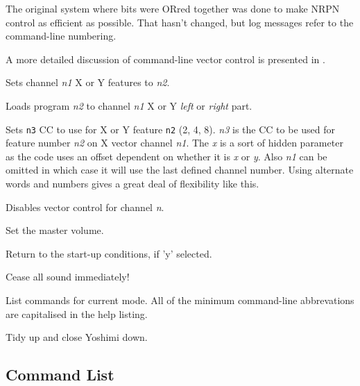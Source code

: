       The original system where bits were ORred together was done to make NRPN
      control as efficient as possible. That hasn't changed, but log messages
      refer to the command-line numbering.

      A more detailed discussion of command-line vector control is presented in
      .

      Sets channel \textsl{n1} X or Y features to \textsl{n2}.

      Loads program \textsl{n2} to channel \textsl{n1} X or Y
      \textsl{left} or \textsl{right} part.

      Sets \texttt{n3} CC to use for X or Y feature \texttt{n2} (2, 4, 8).
      \textsl{n3} is the CC to be used for feature number \textsl{n2} on X
      vector channel \textsl{n1}. The \textsl{x} is a sort of hidden parameter
      as the code uses an offset dependent on whether it is \textsl{x} or
      \textsl{y}. Also \textsl{n1} can be omitted in which case it will use the
      last defined channel number. Using alternate words and numbers gives a
      great deal of flexibility like this.

      Disables vector control for channel \textsl{n}.

      Set the master volume.

      Return to the start-up conditions, if 'y' selected.

      Cease all sound immediately!

      List commands for current mode.  All of the minimum command-line
      abbrevations are capitalised in the help listing.

         Tidy up and close Yoshimi down.


\iffalse

\subsection{Command List}
\label{subsec:command_line_command_list}

